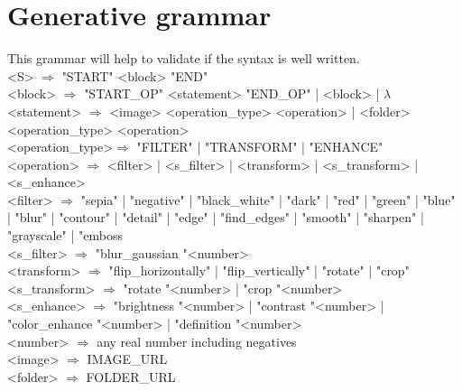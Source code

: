 \section{Generative grammar}
This grammar will help to validate if the syntax is well written.\\
<S>              $\Rightarrow$ "START" <block> "END"\\
<block>          $\Rightarrow$ "START\_OP" <statement> "END\_OP" | <block> | $\lambda$\\
<statement>      $\Rightarrow$ <image> <operation\_type> <operation> | <folder> <operation\_type> <operation>\\
<operation\_type>$\Rightarrow$ "FILTER" | "TRANSFORM" | "ENHANCE"\\
<operation>      $\Rightarrow$ <filter> | <s\_filter> | <transform> | <s\_transform> | <s\_enhance>\\
<filter>         $\Rightarrow$ "sepia" | "negative" | "black\_white" | "dark" | "red" | "green" | "blue" | "blur" | "contour" | "detail" | "edge" | "find\_edges" | "smooth" | "sharpen" | "grayscale" | "emboss\\
<s\_filter>      $\Rightarrow$ "blur\_gaussian "<number>\\
<transform>      $\Rightarrow$ "flip\_horizontally" | "flip\_vertically" | "rotate" | "crop"\\
<s\_transform>   $\Rightarrow$ "rotate "<number> | "crop "<number>\\
<s\_enhance>     $\Rightarrow$ "brightness "<number> | "contrast "<number> | "color\_enhance "<number> | "definition "<number>\\
<number>         $\Rightarrow$ any real number including negatives\\
<image>          $\Rightarrow$ IMAGE\_URL\\
<folder>         $\Rightarrow$ FOLDER\_URL\\
